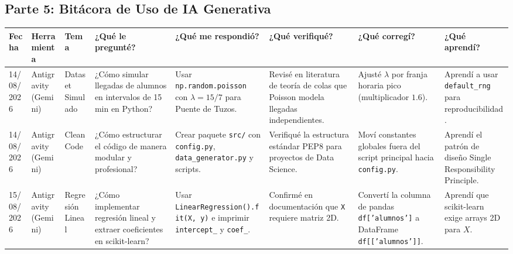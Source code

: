 \begin{landscape}
\section{Parte 5: Bitácora de Uso de IA Generativa}
\vspace{-0.6em}
\begin{center}
	\label{tab:bitacora_completa}
	\vspace{0.2em}
	\fontsize{7pt}{8.2pt}\selectfont
	\setlength{\tabcolsep}{3pt}
	\renewcommand{\arraystretch}{0.72}
	\begin{tabularx}{\linewidth}{p{1.3cm} p{1.6cm} p{1.6cm} X X X X X}
		\toprule
		\rowcolor{purpleUPP!10!white}
		\textbf{Fecha} & \textbf{Herramienta} & \textbf{Tema} & \textbf{¿Qué le pregunté?} & \textbf{¿Qué me respondió?} & \textbf{¿Qué verifiqué?} & \textbf{¿Qué corregí?} & \textbf{¿Qué aprendí?} \\
		\midrule
		14/08/2026 & Antigravity (Gemini) & Dataset Simulado & ¿Cómo simular llegadas de alumnos en intervalos de 15 min en Python? & Usar \texttt{np.random.poisson} con $\lambda = 15/7$ para Puente de Tuzos. & Revisé en literatura de teoría de colas que Poisson modela llegadas independientes. & Ajusté $\lambda$ por franja horaria pico (multiplicador $1.6$). & Aprendí a usar \texttt{default\_rng} para reproducibilidad. \\
		\midrule
		14/08/2026 & Antigravity (Gemini) & Clean Code & ¿Cómo estructurar el código de manera modular y profesional? & Crear paquete \texttt{src/} con \texttt{config.py}, \texttt{data\_generator.py} y scripts. & Verifiqué la estructura estándar PEP8 para proyectos de Data Science. & Moví constantes globales fuera del script principal hacia \texttt{config.py}. & Aprendí el patrón de diseño Single Responsibility Principle. \\
		\midrule
		15/08/2026 & Antigravity (Gemini) & Regresión Lineal & ¿Cómo implementar regresión lineal y extraer coeficientes en scikit-learn? & Usar \texttt{LinearRegression().fit(X, y)} e imprimir \texttt{intercept\_} y \texttt{coef\_}. & Confirmé en documentación que \texttt{X} requiere matriz 2D. & Convertí la columna de pandas \texttt{df['alumnos']} a DataFrame \texttt{df[['alumnos']]}. & Aprendí que scikit-learn exige arrays 2D para $X$. \\

\end{tabularx}
\end{center}
\end{landscape}
